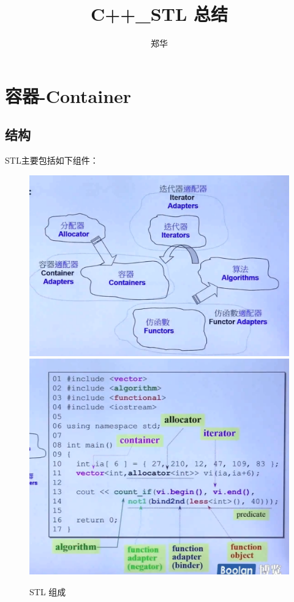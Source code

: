 \documentclass[UTF8,a4paper,12pt]{ctexbook}
\author{\kaishu 郑华}
\title{\textbf{C++\_STL 总结}}
\begin{document}
 
 	\maketitle
 	\tableofcontents

	
\chapter{容器-Container}
	\section{结构}
		STL主要包括如下组件：
		\begin{figure}[H]
			\centering
			\includegraphics[scale=0.3]{stlArc.png}
			\includegraphics[scale=0.34]{stl_example.png}
			\caption{STL 组成}
		\end{figure}
\end{document}
